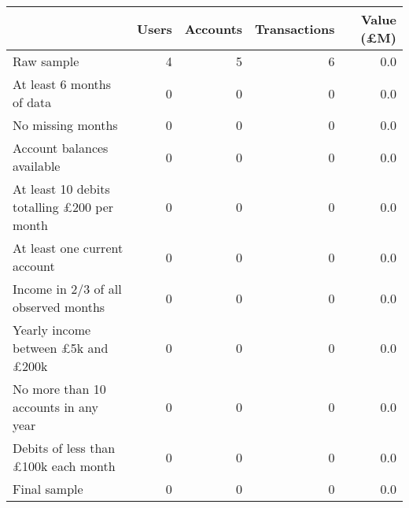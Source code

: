 \begin{tabular}{lrrrr}
\toprule
                                                  & Users & Accounts & Transactions & Value (\pounds M) \\
\midrule
                                       Raw sample &     4 &        5 &            6 &               0.0 \\
                        At least 6 months of data &     0 &        0 &            0 &               0.0 \\
                                No missing months &     0 &        0 &            0 &               0.0 \\
                       Account balances available &     0 &        0 &            0 &               0.0 \\
At least 10 debits totalling \pounds200 per month &     0 &        0 &            0 &               0.0 \\
                     At least one current account &     0 &        0 &            0 &               0.0 \\
             Income in 2/3 of all observed months &     0 &        0 &            0 &               0.0 \\
  Yearly income between \pounds5k and \pounds200k &     0 &        0 &            0 &               0.0 \\
             No more than 10 accounts in any year &     0 &        0 &            0 &               0.0 \\
       Debits of less than \pounds100k each month &     0 &        0 &            0 &               0.0 \\
                                     Final sample &     0 &        0 &            0 &               0.0 \\
\bottomrule
\end{tabular}
